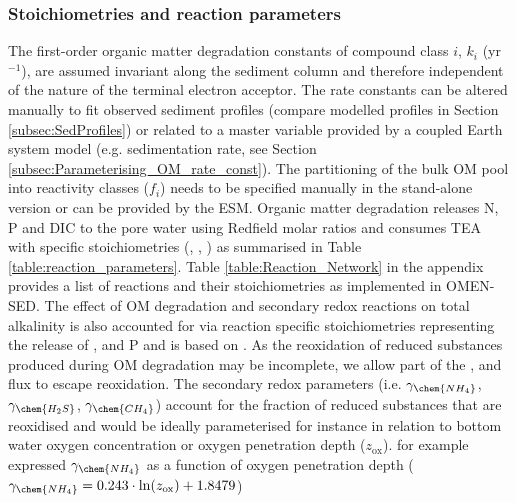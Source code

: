 \documentclass[gmd, manuscript]{copernicus}
\begin{document}
\subsubsection {Stoichiometries and reaction parameters}\label{subsubsec:Stoich_reaction_params}
The first-order organic matter degradation constants of compound class $i$, $k_i$ (yr$^{-1}$), are assumed invariant along the sediment column and therefore independent of the nature 
of the terminal electron acceptor. The rate constants can be altered manually to fit observed sediment profiles (compare modelled profiles in Section \ref{subsec:SedProfiles}) or related to a master variable 
provided by a coupled Earth system model (e.g. sedimentation rate, see Section \ref{subsec:Parameterising_OM_rate_const}). 
The partitioning of the bulk OM pool into reactivity classes ($f_i$) needs to be specified manually in the stand-alone version or can be provided by the ESM. 
Organic matter degradation releases N, P and DIC to the pore water using Redfield molar ratios \citep{redfield1963influence} and consumes TEA with specific stoichiometries (, , ) as summarised in Table \ref{table:reaction_parameters}. 
Table \ref{table:Reaction_Network} in the appendix provides a list of reactions and their stoichiometries as implemented in OMEN-SED. 
The effect of OM degradation and secondary redox reactions on total alkalinity is also accounted for via reaction specific stoichiometries representing the release of ,  and P and is based on \citet[][]{jourabchi_quantitative_2005}. 
As the reoxidation of reduced substances produced during OM degradation may be incomplete, we allow part of the ,  and  flux to escape reoxidation. 
The secondary redox parameters (i.e. $\gamma_{\chem{NH_4}}$, $\gamma_{\chem{H_2S}}$, $\gamma_{\chem{CH_4}}$) account for the fraction of reduced substances that are reoxidised and would be ideally parameterised for instance in relation to bottom water 
oxygen concentration or oxygen penetration depth ($z_{\mathrm{ox}}$). \citet{gypens_simple_2008} for example expressed $\gamma_{\chem{NH_4}}$ as a function of oxygen penetration depth ($\gamma_{\chem{NH_4}} = 0.243 \cdot \mathrm{ln}(z_{\mathrm{ox}}) + 1.8479$) 
\end{document}
